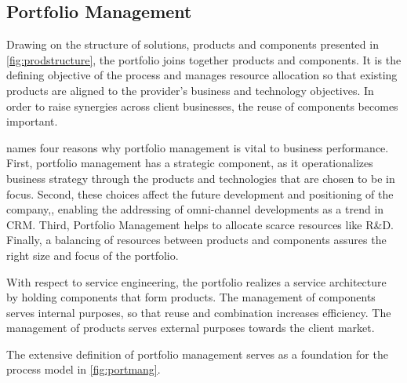 	
	
	
	\subsection{Portfolio Management}
	\label{sec:portmang}
	
	Drawing on the structure of solutions, products and components presented in \Fig \ref{fig:prodstructure}, the portfolio joins together products and components. It is the defining objective of the process and manages resource allocation so that existing products are aligned to the provider's business and technology objectives. In order to raise synergies across client businesses, the reuse of components becomes important. 
	
	\cite{cooper1999new} names four reasons why portfolio management is vital to business performance. First, portfolio management has a strategic component, as it operationalizes business strategy through the products and technologies that are chosen to be in focus. Second, these choices affect the future development and positioning of the company,\eg, enabling the addressing of omni-channel developments as a trend in \acrshort{CRM}. Third, Portfolio Management helps to allocate scarce resources like R\&D. Finally, a balancing of resources between products and components assures the right size and focus of the portfolio.     
	
	With respect to service engineering, the portfolio realizes a service architecture  \citep{Bohmann2006} by holding components that form products. The management of components serves internal purposes, so that reuse and combination increases efficiency. The management of products serves external purposes towards the client market. 
	
	The extensive definition of portfolio management \citep[]{cooper1999new} serves as a foundation for the process model in \Fig \ref{fig:portmang}. 
	
